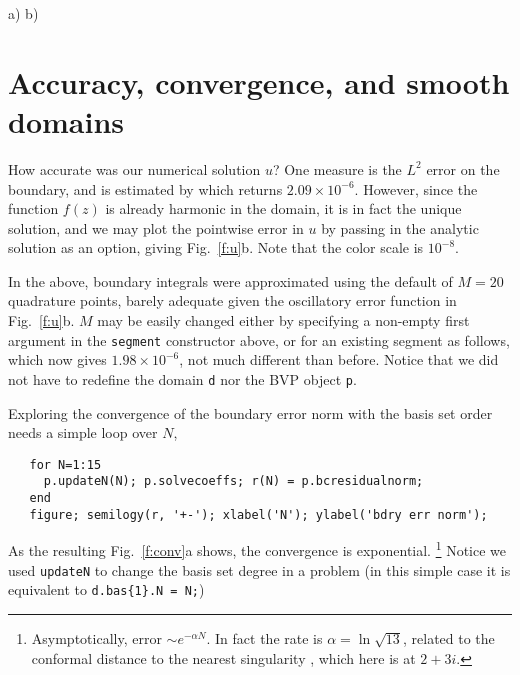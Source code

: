\bfi %
a)
b)
\efi

\section{Accuracy, convergence, and smooth domains}
\label{s:conv}

How accurate was our numerical solution $u$? One measure is the
$L^2$ error on the boundary, and is estimated by
which returns $2.09 \times 10^{-6}$.
However, since the function $f(z)$ is already harmonic in the domain,
it is in fact the unique solution, and we may plot the
pointwise error in $u$ by passing in the analytic solution as an option,
giving Fig.~\ref{f:u}b. Note that the color scale is $10^{-8}$.

In the above, boundary integrals were approximated using the default of
$M=20$ quadrature points, barely adequate given the
oscillatory error function in Fig.~\ref{f:u}b.
$M$ may be easily changed either by specifying
a non-empty first argument in the {\tt segment} constructor above, or
for an existing segment as follows,
which now gives $1.98\times 10^{-6}$, not much different than before.
Notice that we did not have to redefine the domain {\tt d} nor
the BVP object {\tt p}.

Exploring the convergence of the boundary error norm with the basis set order
needs a simple loop over $N$,
\begin{verbatim}
   for N=1:15
     p.updateN(N); p.solvecoeffs; r(N) = p.bcresidualnorm;
   end
   figure; semilogy(r, '+-'); xlabel('N'); ylabel('bdry err norm');
\end{verbatim}
As the resulting Fig.~\ref{f:conv}a shows, the convergence is exponential.%
  \footnote{Asymptotically, error $\sim e^{-\alpha N}$. In fact the rate is
    $\alpha = \ln \sqrt{13}$, related to the conformal distance to
    the nearest singularity \cite{timothesis}, which here is at $2+3i$.}
Notice we used {\tt updateN} to change the basis set degree
in a problem (in this simple case it is equivalent to 
\verb?d.bas{1}.N = N;?)


